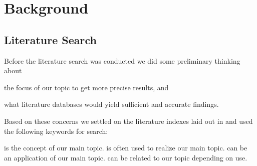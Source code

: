 \chapter{Background}
\label{chapter:background}

%
%
%
%
%
%

\section{Literature Search}
\label{section:literature.search}

Before the literature search was conducted we did some preliminary thinking
about
\begin{inparaenum}[(i)]
  \item the focus of our topic to get more precise results, and
  \item what literature databases would yield sufficient and accurate
    findings.
\end{inparaenum}
Based on these concerns we settled on the literature indexes laid out in
 and used the following keywords%
for search:

\begin{items}
   is the concept of our main topic.
   is often used to realize our
    main topic.
   can be an application of our main topic.
   can be related to our topic depending on use.
\end{items}

